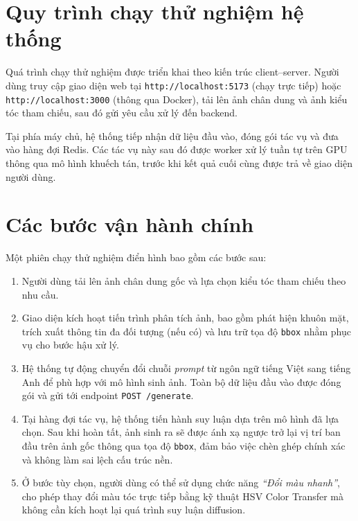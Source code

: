 \documentclass[../main.tex]{subfiles}
\begin{document}
\section{Quy trình chạy thử nghiệm hệ thống}

Quá trình chạy thử nghiệm được triển khai theo kiến trúc client--server. Người dùng truy cập giao diện web tại \texttt{http://localhost:5173} (chạy trực tiếp) hoặc \texttt{http://localhost:3000} (thông qua Docker), tải lên ảnh chân dung và ảnh kiểu tóc tham chiếu, sau đó gửi yêu cầu xử lý đến backend.

Tại phía máy chủ, hệ thống tiếp nhận dữ liệu đầu vào, đóng gói tác vụ và đưa vào hàng đợi Redis. Các tác vụ này sau đó được worker xử lý tuần tự trên GPU thông qua mô hình khuếch tán, trước khi kết quả cuối cùng được trả về giao diện người dùng.

\section{Các bước vận hành chính}

Một phiên chạy thử nghiệm điển hình bao gồm các bước sau:

\begin{enumerate}
    \item Người dùng tải lên ảnh chân dung gốc và lựa chọn kiểu tóc tham chiếu theo nhu cầu.
    
    \item Giao diện kích hoạt tiến trình phân tích ảnh, bao gồm phát hiện khuôn mặt, trích xuất thông tin đa đối tượng (nếu có) và lưu trữ tọa độ \texttt{bbox} nhằm phục vụ cho bước hậu xử lý.
    
    \item Hệ thống tự động chuyển đổi chuỗi \textit{prompt} từ ngôn ngữ tiếng Việt sang tiếng Anh để phù hợp với mô hình sinh ảnh. Toàn bộ dữ liệu đầu vào được đóng gói và gửi tới endpoint \texttt{POST /generate}.
    
    \item Tại hàng đợi tác vụ, hệ thống tiến hành suy luận dựa trên mô hình đã lựa chọn. Sau khi hoàn tất, ảnh sinh ra sẽ được ánh xạ ngược trở lại vị trí ban đầu trên ảnh gốc thông qua tọa độ \texttt{bbox}, đảm bảo việc chèn ghép chính xác và không làm sai lệch cấu trúc nền.
    
    \item Ở bước tùy chọn, người dùng có thể sử dụng chức năng \textit{``Đổi màu nhanh''}, cho phép thay đổi màu tóc trực tiếp bằng kỹ thuật HSV Color Transfer mà không cần kích hoạt lại quá trình suy luận diffusion.
\end{enumerate}
\end{document}
